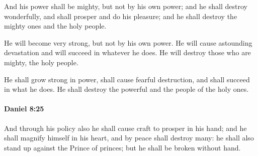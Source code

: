 			\begin{versebox}
					\item[BHS] 
					\item[LXX] 
					\item[ASV] And his power shall be mighty, but not by his own power; and he shall destroy wonderfully, and shall prosper and do his pleasure; and he shall destroy the mighty ones and the holy people.
					\item[NIV] He will become very strong, but not by his own power. He will cause astounding devastation and will succeed in whatever he does. He will destroy those who are mighty, the holy people.
					\item[NRSV] He shall grow strong in power, shall cause fearful destruction, and shall succeed in what he does. He shall destroy the powerful and the people of the holy ones.
			\end{versebox}

		\paragraph{Daniel 8:25} %
			\label{DANIEL-8-25}

			And through his policy also he shall cause craft to prosper in his hand; and he shall magnify himself in his heart, and by peace shall destroy many: he shall also stand up against the Prince of princes; but he shall be broken without hand.

